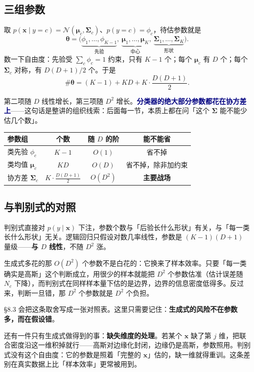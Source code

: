\documentclass[11pt,a4paper,fontset=windows,zihao=-4]{ctexart}
\newcommand{\bx}{\mathbf{x}}
\newcommand{\bSigma}{\boldsymbol{\Sigma}}
\newcommand{\bmu}{\boldsymbol{\mu}}
\newcommand{\btheta}{\boldsymbol{\theta}}
\newcommand{\Ncal}{\mathcal{N}}
\newcommand{\hl}[1]{\textcolor{navy}{\textbf{#1}}}
\newcommand{\tabhead}{\sffamily\bfseries\color{navy}}
\begin{document}
\subsection{三组参数}

取 $p(\bx\mid y=c)=\Ncal(\bmu_c,\bSigma_c)$、$p(y=c)=\phi_c$，待估参数就是
\[
  \btheta=\bigl(\underbrace{\phi_1,\dots,\phi_{K-1}}_{\text{先验}},\ \underbrace{\bmu_1,\dots,\bmu_K}_{\text{中心}},\ \underbrace{\bSigma_1,\dots,\bSigma_K}_{\text{形状}}\bigr).
\]
数一下自由度：先验受 $\sum_c\phi_c=1$ 约束，只有 $K-1$ 个；每个 $\bmu_c$ 有 $D$ 个；每个 $\bSigma_c$ 对称，有 $D(D+1)/2$ 个。于是
\begin{equation}
  \#\btheta=(K-1)+KD+K\cdot\frac{D(D+1)}{2}.
  \label{eq:nparam-qda}
\end{equation}

第二项随 $D$ 线性增长，第三项随 $D^2$ 增长。\hl{分类器的绝大部分参数都花在协方差上}——这句话是整讲的组织线索：后面每一节，本质上都在问「这个 $\bSigma$ 能不能少估几个数」。

\begin{center}
\small
\begin{tabular}{@{}lccc@{}}
\toprule
\rowcolor{navy!7}
\tabhead 参数组 & \tabhead 个数 & \tabhead 随 $D$ 的阶 & \tabhead 能不能省\\
\midrule
类先验 $\phi_c$ & $K-1$ & $O(1)$ & 省不掉\\
类均值 $\bmu_c$ & $KD$ & $O(D)$ & 省不掉，除非加约束\\
协方差 $\bSigma_c$ & $K\cdot\frac{D(D+1)}{2}$ & $O(D^2)$ & \textbf{主要战场}\\
\bottomrule
\end{tabular}
\end{center}

\subsection{与判别式的对照}

\begin{add}[同一件事的两种赌法]
判别式直接对 $p(y\mid\bx)$ 下注，参数个数与「后验长什么形状」有关，与「每一类长什么形状」无关。逻辑回归只假设对数几率线性，参数是 $(K-1)(D+1)$ 量级——\textbf{与 $D$ 线性}，不随 $D^2$ 涨。

生成式多花的那 $O(D^2)$ 个参数不是白花的：它换来了样本效率。只要「每一类确实是高斯」这个判断成立，用很少的样本就能把 $D^2$ 个参数估准（估计误差随 $N_c$ 下降），而判别式在同样样本量下估的是边界，边界的信息密度低得多。反过来，判断一旦错，那 $D^2$ 个参数就是 $D^2$ 个负担。

§8.3 会把这条取舍写成一张对照表。这里只需要记住：\textbf{生成式的风险不在参数多，而在假设错}。

还有一件只有生成式做得到的事：\textbf{缺失维度的处理}。若某个 $\bx$ 缺了第 $j$ 维，把联合密度沿这一维积掉就行——高斯对边缘化封闭，边缘仍是高斯，参数照用。判别式没有这个自由度：它的参数是照着「完整的 $\bx$」估的，缺一维就得重训。这条差别在真实数据上比「样本效率」更常被用到。
\end{add}
\end{document}
